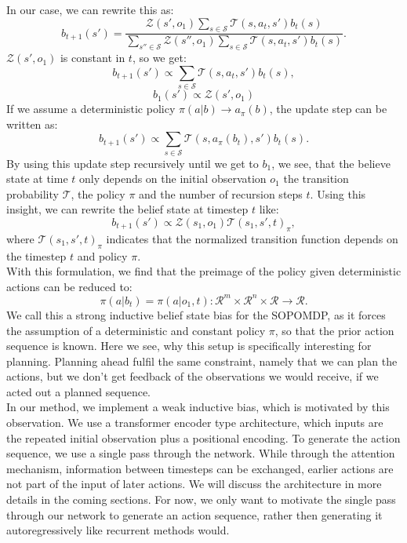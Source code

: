 In our case, we can rewrite this as:
\begin{equation}
    b_{t+1}(s') = \frac{\mathcal{Z}(s', o_{1}) \sum_{s \in \mathcal{S}} \mathcal{T}(s, a_t, s') b_t(s)}{\sum_{s'' \in \mathcal{S}} \mathcal{Z}(s'', o_{1}) \sum_{s \in \mathcal{S}} \mathcal{T}(s, a_t, s') b_t(s)}.
\end{equation}
$\mathcal{Z}(s', o_{1})$ is constant in $t$, so we get:
\begin{equation*}
    b_{t+1}(s') \propto \sum_{s \in \mathcal{S}} \mathcal{T}(s, a_t, s') b_t(s),
\end{equation*}
\begin{equation}
    b_{1}(s') \propto \mathcal{Z}(s', o_{1})
\end{equation}
If we assume a deterministic policy $\pi(a|b) \rightarrow a_{\pi}(b)$, the update step can be written as:
\begin{equation}
    b_{t+1}(s') \propto \sum_{s \in \mathcal{S}} \mathcal{T}(s, a_{\pi}(b_t), s') b_t(s).
\end{equation}
By using this update step recursively until we get to $b_{1}$, we see, that the believe state at time $t$ only depends on the initial observation $o_1$
the transition probability $\mathcal{T}$, the policy $\pi$ and the number of recursion steps $t$. Using this insight, we can rewrite the belief state at timestep $t$ like:
\begin{equation}
    b_{t+1}(s') \propto \mathcal{Z}(s_1, o_{1}) \mathcal{T}(s_1, s', t)_{\pi},
\end{equation}
where $\mathcal{T}(s_1, s', t)_{\pi}$ indicates that the normalized transition function depends on the timestep $t$ and policy $\pi$.\\
With this formulation, we find that the preimage of the policy given deterministic actions can be reduced to:
$$\pi(a|b_t) = \pi(a|o_1, t): \mathcal{R}^m \times \mathcal{R}^{n} \times \mathcal{R} \rightarrow \mathcal{R}.$$
We call this a strong inductive belief state bias for the SOPOMDP, as it forces the assumption of a deterministic and constant policy $\pi$, so that the prior action sequence is known. 
Here we see, 
why this setup is specifically interesting for planning. Planning ahead fulfil the same constraint, namely that we can plan the actions, but we don't get feedback of the 
observations we would receive, if we acted out a planned sequence. \\

In our method, we implement a weak inductive bias, which is motivated by this observation. We use a transformer encoder type architecture, which inputs are 
the repeated initial observation plus a positional encoding. To generate the action sequence, we use a single pass through the network. While through the attention mechanism, 
information between timesteps can be exchanged, earlier actions are not part of the input of later actions. 
We will discuss the architecture in more details in the coming sections. For now, we only want to motivate the single pass through 
our network to generate an action sequence, rather then generating it autoregressively like recurrent methods would.\\ 

